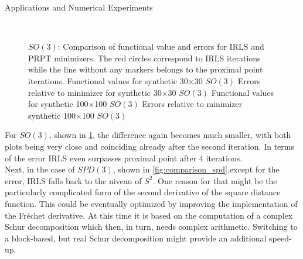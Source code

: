 \begin{chapter}{Applications and Numerical Experiments}
\begin{figure}[h!]
{    }
    \\
    \caption[Comparison IRLS \& PRPT for Euclidean $SO(3)$]{$SO(3)$: Comparison of functional value and errors for IRLS and PRPT minimizers.
	The red circles correspond to IRLS iterations while the line without any markers belongs to the proximal point iterations.
	 Functional values for synthetic 30$\times$30 $SO(3)$
	  Errors relative to minimizer for synthetic 30$\times$30 $SO(3)$
	  Functional values for synthetic 100$\times$100 $SO(3)$
	  Errors relative to minimizer synthetic 100$\times$100 $SO(3)$
	\label{fig:comparison_son}
    }
\end{figure}

For $SO(3)$, shown in \ref{fig:comparison_son}, the difference again becomes much smaller, with both plots being very close and coinciding already after the second iteration. In terms of the
error IRLS even surpasses proximal point after 4 iterations.\\

Next, in the case of $SPD(3)$, shown in \ref{fig:comparison_spd},except for the error, IRLS falls back to the niveau of $S^2$. One reason for that might be the particularly complicated form of the second
derivative of the square distance function. This could be eventually optimized by improving the implementation of the Fr\'{e}chet derivative. At this time it is based on
the computation of a complex Schur decomposition which then, in turn, needs complex arithmetic. Switching to a block-based, but real Schur decomposition might provide an additional speed-up.\\


\end{chapter}
